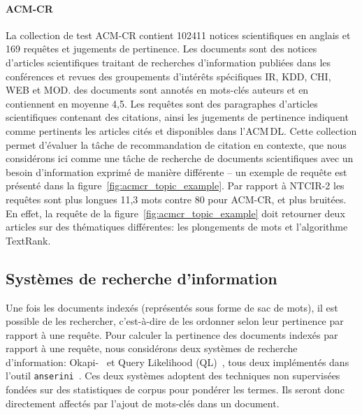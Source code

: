 \paragraph{ACM-CR~\cite{boudin_acm-cr_2021}}
La collection de test ACM-CR contient \num{102 411} notices scientifiques en anglais et 169 requêtes et jugements de pertinence.
Les documents sont des notices d'articles scientifiques traitant de recherches d'information publiées dans les conférences et revues des groupements d'intérêts spécifiques IR, KDD, CHI, WEB et MOD.
 des documents sont annotés en mots-clés auteurs et en contiennent en moyenne 4,5.
Les requêtes sont des paragraphes d'articles scientifiques contenant des citations, ainsi les jugements de pertinence indiquent comme pertinents les articles cités et disponibles dans l'ACM\,DL.
Cette collection permet d'évaluer la tâche de recommandation de citation en contexte, que nous considérons ici comme une tâche de recherche de documents scientifiques avec un besoin d'information exprimé de manière différente -- un exemple de requête est présenté dans la figure~\ref{fig:acmcr_topic_example}.
Par rapport à NTCIR-2 les requêtes sont plus longues 11,3 mots contre 80 pour ACM-CR, et plus bruitées.
En effet, la requête de la figure~\ref{fig:acmcr_topic_example} doit retourner deux articles sur des thématiques différentes: les plongements de mots et l'algorithme TextRank.





\subsection{Systèmes de recherche d'information}

Une fois les documents indexés (représentés sous forme de sac de mots), il est possible de les rechercher, c'est-à-dire de les ordonner selon leur pertinence par rapport à une requête.
Pour calculer la pertinence des documents indexés par rapport à une requête, nous considérons deux systèmes de recherche d'information: Okapi-\bm{}~\cite{robertson_okapi_1999} et Query Likelihood (QL)~\cite{ponte_language_1998}, tous deux implémentés dans l'outil \texttt{anserini}~\cite{yang_anserini_2017}.
Ces deux systèmes adoptent des techniques non supervisées fondées sur des statistiques de corpus pour pondérer les termes. Ils seront donc directement affectés par l'ajout de mots-clés dans un document.

